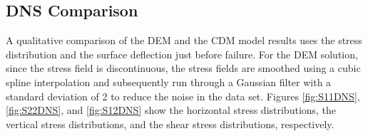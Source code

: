 \subsection{DNS Comparison}

A qualitative comparison of the DEM and the CDM model results uses the stress distribution and the surface deflection just before failure. For the DEM solution, since the stress field is discontinuous, the stress fields are smoothed using a cubic spline interpolation and subsequently run through a Gaussian filter with a standard deviation of 2 to reduce the noise in the data set. Figures \ref{fig:S11DNS}, \ref{fig:S22DNS}, and \ref{fig:S12DNS} show the horizontal stress distributions, the vertical stress distributions, and the shear stress distributions, respectively.
